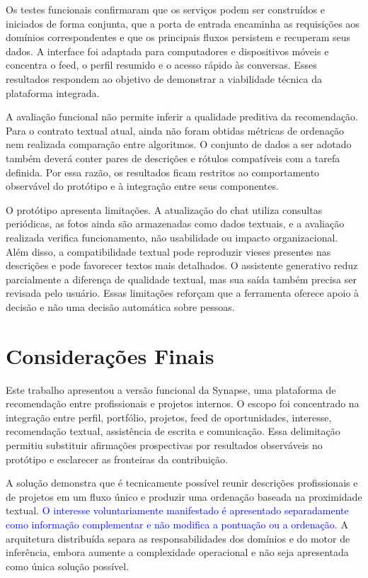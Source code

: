 \documentclass[12pt]{article}
\begin{document}
Os testes funcionais confirmaram que os serviços podem ser construídos e iniciados de forma conjunta, que a porta de entrada encaminha as requisições aos domínios correspondentes e que os principais fluxos persistem e recuperam seus dados. A interface foi adaptada para computadores e dispositivos móveis e concentra o feed, o perfil resumido e o acesso rápido às conversas. Esses resultados respondem ao objetivo de demonstrar a viabilidade técnica da plataforma integrada.

A avaliação funcional não permite inferir a qualidade preditiva da recomendação. Para o contrato textual atual, ainda não foram obtidas métricas de ordenação nem realizada comparação entre algoritmos. O conjunto de dados a ser adotado também deverá conter pares de descrições e rótulos compatíveis com a tarefa definida. Por essa razão, os resultados ficam restritos ao comportamento observável do protótipo e à integração entre seus componentes.

O protótipo apresenta limitações. A atualização do chat utiliza consultas periódicas, as fotos ainda são armazenadas como dados textuais, e a avaliação realizada verifica funcionamento, não usabilidade ou impacto organizacional. Além disso, a compatibilidade textual pode reproduzir vieses presentes nas descrições e pode favorecer textos mais detalhados. O assistente generativo reduz parcialmente a diferença de qualidade textual, mas sua saída também precisa ser revisada pelo usuário. Essas limitações reforçam que a ferramenta oferece apoio à decisão e não uma decisão automática sobre pessoas.

\section{Considerações Finais}

Este trabalho apresentou a versão funcional da Synapse, uma plataforma de recomendação entre profissionais e projetos internos. O escopo foi concentrado na integração entre perfil, portfólio, projetos, feed de oportunidades, interesse, recomendação textual, assistência de escrita e comunicação. Essa delimitação permitiu substituir afirmações prospectivas por resultados observáveis no protótipo e esclarecer as fronteiras da contribuição.

A solução demonstra que é tecnicamente possível reunir descrições profissionais e de projetos em um fluxo único e produzir uma ordenação baseada na proximidade textual. \textcolor{blue}{O interesse voluntariamente manifestado é apresentado separadamente como informação complementar e não modifica a pontuação ou a ordenação.} A arquitetura distribuída separa as responsabilidades dos domínios e do motor de inferência, embora aumente a complexidade operacional e não seja apresentada como única solução possível.
\end{document}
